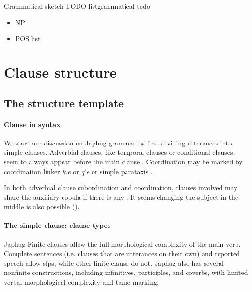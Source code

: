 \documentclass[a4paper, oneside, 12pt]{report}
\newcommand*{\citesec}[1]{\S~{#1}}
\newcommand*{\citechap}[1]{Ch~{#1}}
\newcommand*{\citepage}[1]{p.~{#1}}
\newcommand{\form}[1]{\emph{#1}}
\begin{document}
\begin{todobox}{Grammatical sketch TODO list}{grammatical-todo}
    \begin{itemize}
        \item NP
        \item POS list
    \end{itemize}
\end{todobox}

\section{Clause structure}\label{sec:grammatical.clause}

\subsection{The structure template}\label{sec:grammatical.clause.template}

\paragraph*{Clause in syntax}
We start our discussion on Japhug grammar 
by first dividing utterances into simple clauses.
Adverbial clauses, like temporal clauses or conditional clauses,
seem to always appear before the main clause \citep[\citechap{25}]{jacques2021grammar}.
Coordination may be marked by coordination linker \form{tɕe} or \form{qʰe} or simple parataxis
\citep[\citesec{25.1.6}]{jacques2021grammar}.

In both adverbial clause subordination and coordination,
clauses involved may share the auxiliary copula if there is any
\citep[\citepage{47}, (40); \citepage{1091}, (10)]{jacques2021grammar}.
It seems changing the subject in the middle is also possible
().

\paragraph*{The simple clause: clause types}
Japhug Finite clauses allow the full morphological complexity of the main verb.
Complete sentences (i.e. clauses that are utterances on their own)
and reported speech \citep[\citesec{24.2.5.1}]{jacques2021grammar} allow \acp{sfp},
while other finite clause do not.
Japhug also has several nonfinite constructions,
including infinitives, participles, and coverbs,
with limited verbal morphological complexity and \ac{tame} marking.  
\end{document}
